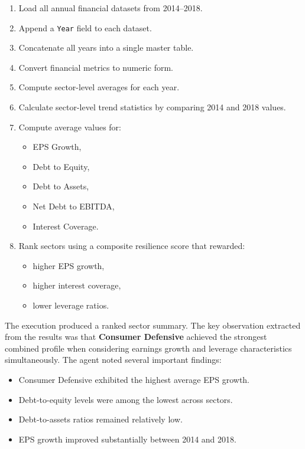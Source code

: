 \begin{enumerate}
  \item Load all annual financial datasets from 2014--2018.
  \item Append a \texttt{Year} field to each dataset.
  \item Concatenate all years into a single master table.
  \item Convert financial metrics to numeric form.
  \item Compute sector-level averages for each year.
  \item Calculate sector-level trend statistics by comparing 2014 and 2018 values.
  \item Compute average values for:
    \begin{itemize}
      \item EPS Growth,
      \item Debt to Equity,
      \item Debt to Assets,
      \item Net Debt to EBITDA,
      \item Interest Coverage.
    \end{itemize}
  \item Rank sectors using a composite resilience score that rewarded:
    \begin{itemize}
      \item higher EPS growth,
      \item higher interest coverage,
      \item lower leverage ratios.
    \end{itemize}
\end{enumerate}

The execution produced a ranked sector summary. The key observation extracted from the results was that \textbf{Consumer Defensive} achieved the strongest combined profile when considering earnings growth and leverage characteristics simultaneously. The agent noted several important findings:

\begin{itemize}
  \item Consumer Defensive exhibited the highest average EPS growth.
  \item Debt-to-equity levels were among the lowest across sectors.
  \item Debt-to-assets ratios remained relatively low.
  \item EPS growth improved substantially between 2014 and 2018.
\end{itemize}

